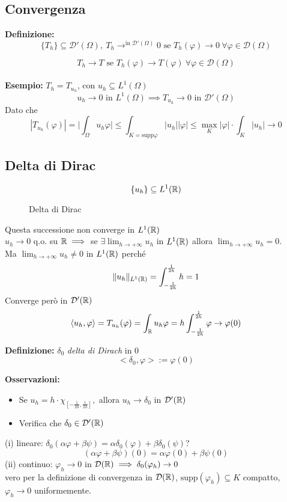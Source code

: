 \subsection{Convergenza}
\begin{tcolorbox}
\textbf{Definizione: }
\[\{T_h\} \subseteq  \mathcal D'(\Omega),\ T_h\to^{\text{in }\mathcal D'(\Omega)}0\text{ se }T_h(\varphi)\to 0\ \forall \varphi\in \mathcal D(\Omega)\] 
\end{tcolorbox}
\[T_h\to T\text{ se }T_h(\varphi)\to T(\varphi)	\ \forall \varphi\in \mathcal D(\Omega)\]
\\\textbf{Esempio: }$T_h=T_{u_h}$, con $u_h\subseteq  L^{1}(\Omega)$ \\
\[u_h\to 0\text{ in }L^{1}(\Omega)\implies T_{u_h}\to 0\text{ in }\mathcal D'(\Omega)\]
Dato che
\[|T_{u_h}(\varphi)|=\bigg|\int_{\Omega}^{} u_h\varphi \bigg|\le \int_{K=\text{supp}\varphi}^{} |u_h| |\varphi|\le \max_K|\varphi|\cdot \int_{K}^{}  |u_h|\to 0\]
\subsection{Delta di Dirac}
\[\{u_h\} \subseteq  L^{1}(\mathbb{R})\]
\begin{figure}[ht]
    \centering
    \caption{Delta di Dirac}
    \label{fig:dirac}
\end{figure}
Questa successione non converge in $L^{1}(\mathbb{R})$\\
$u_h\to 0$ q.o. su $\mathbb{R}\implies $ se $\exists \lim_{h \to +\infty} u_h$ in $L^{1}(\mathbb{R})$ allora $\lim_{h \to +\infty} u_h=0$.
\\Ma $\lim_{h \to +\infty} u_h\neq 0$ in $L^{1}(\mathbb{R})$ perché
\[\|u_h\|_{L^{1}(\mathbb{R})}=\int_{-\frac{1}{2h}}^{\frac{1}{2h}} h=1\]
Converge però in $\mathcal D'(\mathbb{R})$ 
\[\left<u_h,\varphi \right> =T_{u_h}(\varphi)=\int_{\mathbb{R}}^{} u_h\varphi=h \int_{-\frac{1}{2h}}^{\frac{1}{2h}} \varphi\to \varphi(0)\]  
\begin{tcolorbox}
	\textbf{Definizione: }$\delta_0$ \emph{delta di Dirach} in 0
	\[<\delta_0,\varphi>:=\varphi(0)\]
\end{tcolorbox}
\textbf{Osservazioni:} 
\begin{itemize}
	\item Se $u_h=h\cdot \chi_{[-\frac{1}{2h},\frac{1}{2h}]},$ allora $u_h\to \delta_0$ in $\mathcal D'(\mathbb{R})$ 
	\item Verifica che $\delta_0\in \mathcal D'(\mathbb{R})$
\end{itemize}
(i) lineare: $\delta_0(\alpha\varphi+\beta\psi)=\alpha\delta_0(\varphi)+\beta\delta_0(\psi)$?
\[(\alpha\varphi+\beta\psi)(0)=\alpha\varphi(0)+\beta\psi(0)\]
(ii) continuo: $\varphi_h\to 0$ in $\mathcal D(\mathbb{R})\implies\delta_0(\varphi_h)\to 0$
\\vero per la definizione di convergenza in $\mathcal D(\mathbb{R})$, $\text{supp}(\varphi_h)\subseteq  K$ compatto, $\varphi_h\to 0$ uniformemente.

